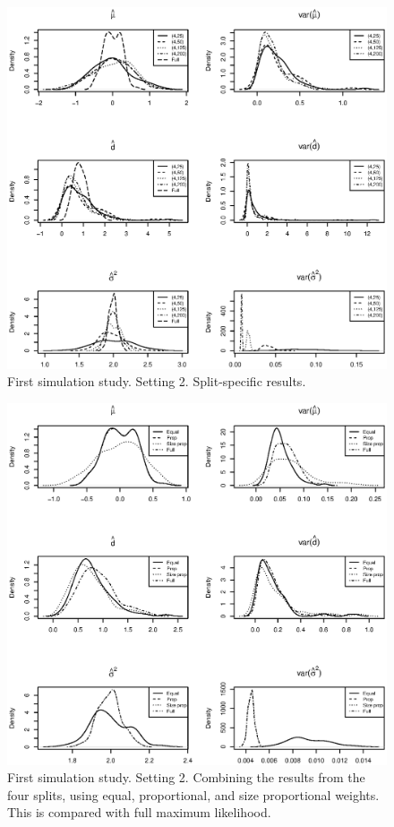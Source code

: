 \documentclass[11pt,a5paper,twoside]{book}
\begin{document}
{\begin{figure}[!t]
\centering
\includegraphics[width=\textwidth]{aCS_diff1.eps}
\caption{\small \linespread{1.1} First simulation study. Setting 2. Split-specific results.} \label{CS_diff1}
\end{figure}
\begin{figure}[!t]
\centering
\includegraphics[width=\textwidth]{aCS_diff_comb.eps}
\caption{\small \linespread{1.1} First simulation study. Setting 2. Combining the results from the four splits, using equal, proportional, and size proportional weights. This is compared with full maximum likelihood.} \label{CS_diff_comb}
\end{figure}


}
\end{document}
